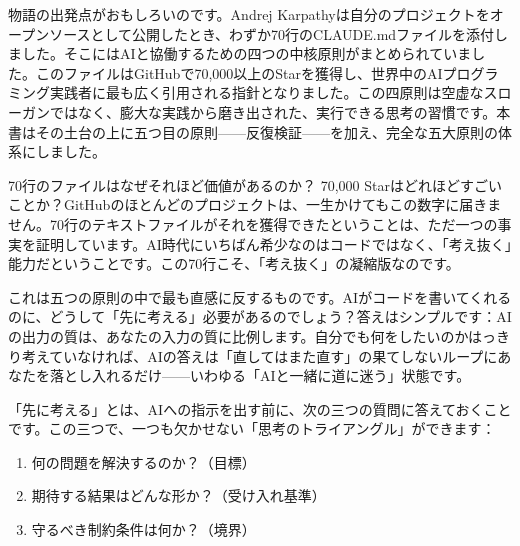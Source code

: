

物語の出発点がおもしろいのです。Andrej Karpathyは自分のプロジェクトをオープンソースとして公開したとき、わずか70行のCLAUDE.mdファイルを添付しました。そこにはAIと協働するための四つの中核原則がまとめられていました。このファイルはGitHubで70,000以上のStarを獲得し、世界中のAIプログラミング実践者に最も広く引用される指針となりました。この四原則は空虚なスローガンではなく、膨大な実践から磨き出された、実行できる思考の習慣です。本書はその土台の上に五つ目の原則——反復検証——を加え、完全な五大原則の体系にしました。

\begin{tcbinfo}{70行のファイルはなぜそれほど価値があるのか？}
70,000 Starはどれほどすごいことか？GitHubのほとんどのプロジェクトは、一生かけてもこの数字に届きません。70行のテキストファイルがそれを獲得できたということは、ただ一つの事実を証明しています。AI時代にいちばん希少なのはコードではなく、「考え抜く」能力だということです。この70行こそ、「考え抜く」の凝縮版なのです。

\end{tcbinfo}


これは五つの原則の中で最も直感に反するものです。AIがコードを書いてくれるのに、どうして「先に考える」必要があるのでしょう？答えはシンプルです：AIの出力の質は、あなたの入力の質に比例します。自分でも何をしたいのかはっきり考えていなければ、AIの答えは「直してはまた直す」の果てしないループにあなたを落とし入れるだけ——いわゆる「AIと一緒に道に迷う」状態です。

「先に考える」とは、AIへの指示を出す前に、次の三つの質問に答えておくことです。この三つで、一つも欠かせない「思考のトライアングル」ができます：

\begin{enumerate}
  \item 何の問題を解決するのか？（目標）
  \item 期待する結果はどんな形か？（受け入れ基準）
  \item 守るべき制約条件は何か？（境界）
\end{enumerate}

